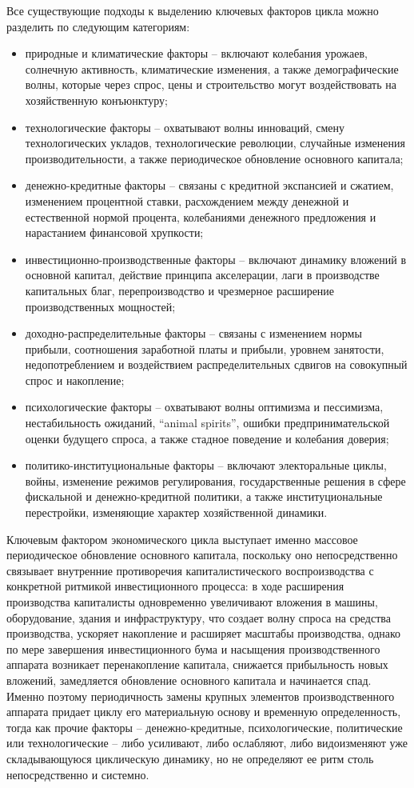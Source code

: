 Все существующие подходы к выделению ключевых факторов цикла можно разделить по следующим категориям:
\begin{itemize}
    \item природные и климатические факторы – включают колебания урожаев, солнечную активность, климатические изменения, а также демографические волны, которые через спрос, цены и строительство могут воздействовать на хозяйственную конъюнктуру;
    \item технологические факторы – охватывают волны инноваций, смену технологических укладов, технологические революции, случайные изменения производительности, а также периодическое обновление основного капитала;
    \item денежно-кредитные факторы – связаны с кредитной экспансией и сжатием, изменением процентной ставки, расхождением между денежной и естественной нормой процента, колебаниями денежного предложения и нарастанием финансовой хрупкости;
    \item инвестиционно-производственные факторы – включают динамику вложений в основной капитал, действие принципа акселерации, лаги в производстве капитальных благ, перепроизводство и чрезмерное расширение производственных мощностей;
    \item доходно-распределительные факторы – связаны с изменением нормы прибыли, соотношения заработной платы и прибыли, уровнем занятости, недопотреблением и воздействием распределительных сдвигов на совокупный спрос и накопление;
    \item психологические факторы – охватывают волны оптимизма и пессимизма, нестабильность ожиданий, “animal spirits”, ошибки предпринимательской оценки будущего спроса, а также стадное поведение и колебания доверия;
    \item политико-институциональные факторы – включают электоральные циклы, войны, изменение режимов регулирования, государственные решения в сфере фискальной и денежно-кредитной политики, а также институциональные перестройки, изменяющие характер хозяйственной динамики.
\end{itemize}

Ключевым фактором экономического цикла выступает именно массовое периодическое обновление основного капитала, поскольку оно непосредственно связывает внутренние противоречия капиталистического воспроизводства с конкретной ритмикой инвестиционного процесса: в ходе расширения производства капиталисты одновременно увеличивают вложения в машины, оборудование, здания и инфраструктуру, что создает волну спроса на средства производства, ускоряет накопление и расширяет масштабы производства, однако по мере завершения инвестиционного бума и насыщения производственного аппарата возникает перенакопление капитала, снижается прибыльность новых вложений, замедляется обновление основного капитала и начинается спад. Именно поэтому периодичность замены крупных элементов производственного аппарата придает циклу его материальную основу и временную определенность, тогда как прочие факторы – денежно-кредитные, психологические, политические или технологические – либо усиливают, либо ослабляют, либо видоизменяют уже складывающуюся циклическую динамику, но не определяют ее ритм столь непосредственно и системно.

